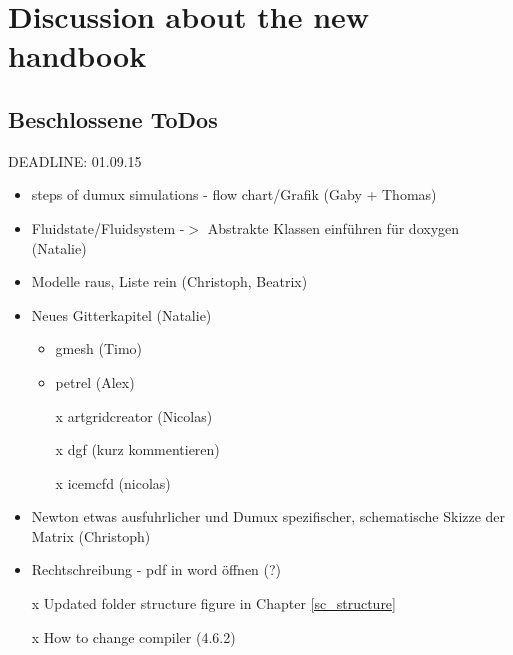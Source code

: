 \chapter*{Discussion about the new handbook}
\section*{Beschlossene ToDos}
DEADLINE: 01.09.15
\begin{itemize}
  \item steps of dumux simulations - flow chart/Grafik (Gaby + Thomas)
  \item Fluidstate/Fluidsystem -$>$ Abstrakte Klassen einführen für doxygen (Natalie)
  \item Modelle raus, Liste rein (Christoph, Beatrix)
  \item Neues Gitterkapitel (Natalie)
  \begin{itemize}
    \item gmesh (Timo)
    \item petrel (Alex)
    \item[x] artgridcreator (Nicolas)
    \item[x] dgf (kurz kommentieren)
    \item[x] icemcfd (nicolas)
  \end{itemize}
  \item Newton etwas ausfuhrlicher und Dumux spezifischer, schematische
        Skizze der Matrix (Christoph)
  \item Rechtschreibung - pdf in word öffnen (?)
  \item[x] Updated folder structure figure in Chapter \ref{sc_structure}
  \item[x] How to change compiler (4.6.2)
\end{itemize}


